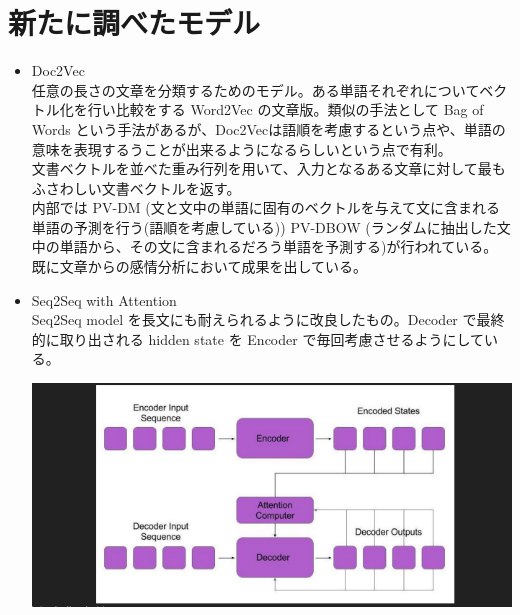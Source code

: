 \documentclass[dvipdfmx,10pt,presentation]{beamer}
\begin{document}
\section{新たに調べたモデル}
\label{sec:org3fb8263}
\begin{frame}[allowframebreaks]{}
\begin{itemize}
\item Doc2Vec\\
任意の長さの文章を分類するためのモデル。ある単語それぞれについてベクトル化を行い比較をする Word2Vec の文章版。類似の手法として Bag of Words という手法があるが、Doc2Vecは語順を考慮するという点や、単語の意味を表現するうことが出来るようになるらしいという点で有利。\\
文書ベクトルを並べた重み行列を用いて、入力となるある文章に対して最もふさわしい文書ベクトルを返す。\\
内部では PV-DM (文と文中の単語に固有のベクトルを与えて文に含まれる単語の予測を行う(語順を考慮している)) PV-DBOW (ランダムに抽出した文中の単語から、その文に含まれるだろう単語を予測する)が行われている。\\
既に文章からの感情分析において成果を出している。\\
\item Seq2Seq with Attention\\
Seq2Seq model を長文にも耐えられるように改良したもの。Decoder で最終的に取り出される hidden state を Encoder で毎回考慮させるようにしている。\\
\begin{center}
\includegraphics[width=.9\linewidth]{./attention.png}
\end{center}
\end{itemize}
\end{frame}
\end{document}
